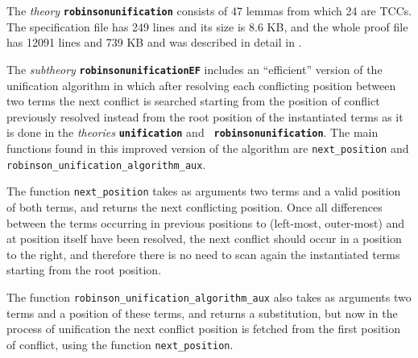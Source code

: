 \documentclass[submission,copyright,creativecommons]{eptcs}
\begin{document}
The \emph{theory} {\tt \bf robinsonunification} consists of 47 lemmas
from which 24 are TCCs.  The specification file has 249 lines and its
size is 8.6 KB, and the whole proof file has 12091 lines and 739 KB
and was described in detail in \cite{AMARG2010}.

The \emph{subtheory} {\tt \bf robinsonunificationEF} includes an
``efficient'' version of the unification algorithm in which after
resolving each conflicting position between two terms the next
conflict is searched starting from the position of conflict previously
resolved instead from the root position of the instantiated terms as
it is done in the \emph{theories} {\tt \bf unification} and {\tt \bf
  robinsonunification}.  The main functions found in this improved
version of the algorithm are {\tt next\_position} and {\tt
  robinson\_unification\_algorithm\_aux}.

The function {\tt next\_position} takes as arguments two terms and a
valid position  of both terms, and returns the next conflicting
position. Once all differences between the terms occurring in previous
positions to  (left-most, outer-most) and at position 
itself have been resolved, the next conflict should occur in a
position to the right, and therefore there is no need to scan again
the instantiated terms starting from the root position.

The function {\tt robinson\_unification\_algorithm\_aux} also takes as
arguments two terms and a position of these terms, and returns a
substitution, but now in the process of unification the next conflict
position is fetched from the first position of conflict, using the
function {\tt next\_position}.
\end{document}
